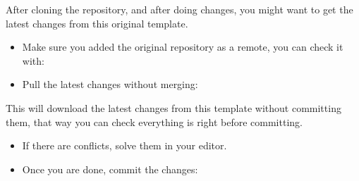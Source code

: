 After cloning the repository, and after doing changes, you might want to
get the latest changes from this original template.

\begin{itemize}
\tightlist
\item
  Make sure you added the original repository as a remote, you can check
  it with:
\end{itemize}

\begin{Shaded}
\begin{Highlighting}[]

\ErrorTok{(}\KeywordTok{)}
\ErrorTok{(}\KeywordTok{)}
\ErrorTok{(}\KeywordTok{)}
\ErrorTok{(}\KeywordTok{)}
\end{Highlighting}
\end{Shaded}

\begin{itemize}
\tightlist
\item
  Pull the latest changes without merging:
\end{itemize}

\begin{Shaded}
\begin{Highlighting}[]
\end{Highlighting}
\end{Shaded}

This will download the latest changes from this template without
committing them, that way you can check everything is right before
committing.

\begin{itemize}
\item
  If there are conflicts, solve them in your editor.
\item
  Once you are done, commit the changes:
\end{itemize}

\begin{Shaded}
\begin{Highlighting}[]
\end{Highlighting}
\end{Shaded}

